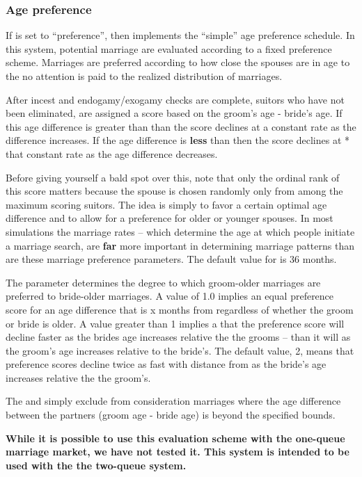 \subsubsection{Age preference}
\label{sec:agepref}
If  is set to ``preference'', then 
implements the ``simple'' age preference schedule. In this system,
potential marriage are evaluated according to a fixed preference
scheme. Marriages are preferred according to how close the spouses are
in age to the  no attention is paid to the
realized distribution of marriages.

After incest and endogamy/exogamy checks are complete, suitors who
have not been eliminated, are assigned a score based on the groom's
age - bride's age.  If this age difference is greater than
 than the score declines at a constant rate
as the difference increases.  If the age difference is \textbf{less}
than  then the score declines at
* that constant rate as the age
difference decreases.

Before giving yourself a bald spot over this, note that only the
ordinal rank of this score matters because the spouse is chosen
randomly only from among the maximum scoring suitors.  The idea is
simply to favor a certain optimal age difference and to allow for a
preference for older or younger spouses.  In most simulations the
marriage rates -- which determine the age at which people initiate a
marriage search, are \textbf{far} more important in determining
marriage patterns than are these marriage preference parameters. The
default value for  is 36
months. 

The  parameter determines the degree to
which groom-older marriages are preferred to bride-older marriages. A
value of 1.0 implies an equal preference score for an age difference
that is x months from  regardless of whether
the groom or bride is older.  A value greater than 1 implies a that
the preference score will decline faster as the brides age increases
relative the the grooms -- than it will as the groom's age increases
relative to the bride's.  The default value, 2, means that preference
scores decline twice as fast with distance from
 as the bride's age increases relative the
the groom's.

The  and 
simply exclude from consideration marriages where the age difference
between the partners (groom age - bride age) is beyond the specified
bounds.

\textbf{While it is possible to use this evaluation scheme
  with the one-queue marriage market, we have not tested it. This
  system is intended to be used with the the two-queue
  system.}




